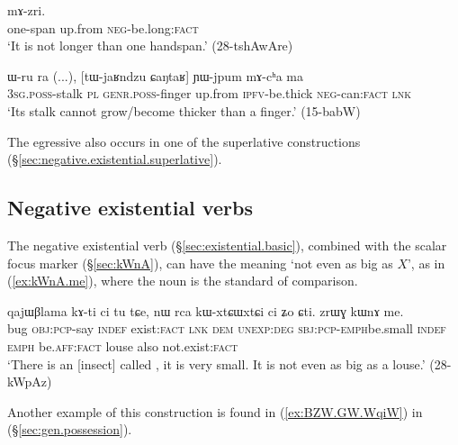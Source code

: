 \begin{exe}
\ex \label{ex:CaNtaR.mAzri}
  mɤ-zri. \\
 one-span up.from \textsc{neg}-be.long:\textsc{fact} \\
 \glt `It is not longer than one handspan.' (28-tshAwAre)
 \end{exe}

\begin{exe}
\ex \label{ex:CaNtaR.YWjpum.mAcha}
 \gll ɯ-ru ra (...), [tɯ-jaʁndzu ɕaŋtaʁ] ɲɯ-jpum mɤ-cʰa ma \\
 \textsc{3sg}.\textsc{poss}-stalk \textsc{pl} {  } \textsc{genr}.\textsc{poss}-finger up.from \textsc{ipfv}-be.thick \textsc{neg}-can:\textsc{fact} \textsc{lnk} \\
 \glt `Its stalk cannot grow/become thicker than a finger.' (15-babW)
 \end{exe}

The egressive  also occurs in one of the superlative constructions (§\ref{sec:negative.existential.superlative}).

\subsection{Negative existential verbs} \label{sec:existential.comparative}
 
The negative existential verb  (§\ref{sec:existential.basic}), combined with the scalar focus marker  (§\ref{sec:kWnA}), can have the meaning `not even as big as $X$', as in (\ref{ex:kWnA.me}), where the noun 
 is the standard of comparison.

\begin{exe}
\ex \label{ex:kWnA.me}
\gll qajɯβlama kɤ-ti ci tu tɕe, nɯ rca kɯ-xtɕɯ\redp{}xtɕi ci ʑo ɕti. zrɯɣ kɯnɤ me. \\
bug \textsc{obj}:\textsc{pcp}-say \textsc{indef} exist:\textsc{fact} \textsc{lnk} \textsc{dem} \textsc{unexp}:\textsc{deg} \textsc{sbj}:\textsc{pcp}-\textsc{emph}\redp{}be.small \textsc{indef} \textsc{emph} be.\textsc{aff}:\textsc{fact} louse also not.exist:\textsc{fact} \\
\glt `There is an [insect] called , it is very small. It is not even as big as a louse.' (28-kWpAz)
\end{exe}
 
Another example of this construction is found in (\ref{ex:BZW.GW.WqiW}) in (§\ref{sec:gen.possession}).

